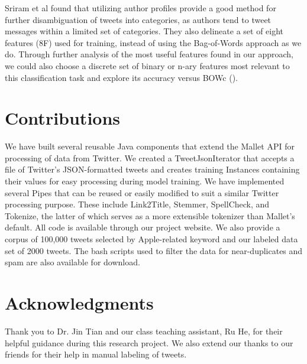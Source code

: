 \documentclass[letterpaper]{article}
\begin{document}
Sriram et al found that utilizing author profiles provide a good method for further disambiguation of tweets into categories, as authors tend to tweet messages within a limited set of categories. They also delineate a set of eight features (8F) used for training, instead of using the Bag-of-Words approach as we do. Through further analysis of the most useful features found in our approach, we could also choose a discrete set of binary or n-ary features most relevant to this classification task and explore its accuracy versus BOWc (\citeauthor{Sriram:2010:STC:1835449.1835643}).


\section{Contributions}
We have built several reusable Java components that extend the Mallet API for processing of data from Twitter. We created a TweetJsonIterator that accepts a file of Twitter's JSON-formatted tweets and creates training Instances containing their values for easy processing during model training. We have implemented several Pipes that can be reused or easily modified to suit a similar Twitter processing purpose. These include Link2Title, Stemmer, SpellCheck, and Tokenize, the latter of which serves as a more extensible tokenizer than Mallet's default. All code is available through our project website. We also provide a corpus of 100,000 tweets selected by Apple-related keyword and our labeled data set of 2000 tweets. The bash scripts used to filter the data for near-duplicates and spam are also available for download.\\

\section{ Acknowledgments}
Thank you to Dr. Jin Tian and our class teaching assistant, Ru He, for their helpful guidance during this research project. We also extend our thanks to our friends for their help in manual labeling of tweets.





\end{document}
